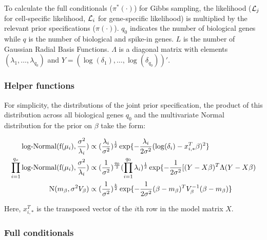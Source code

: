 To calculate the full conditionals ($\pi^*(\cdot)$) for Gibbs sampling, the likelihood ($\mathcal{L}_j$ for cell-specific likelihood, $\mathcal{L}_i$ for gene-specific likelihood) is multiplied by the relevant prior specifications ($\pi(\cdot)$). $q_0$ indicates the number of biological genes while $q$ is the number of biological and spike-in genes. $L$ is the number of Gaussian Radial Basis Functions. $\Lambda$ is a diagonal matrix with elements $(\lambda_1, \ldots, \lambda_{q_0})$ and $Y = (\log(\delta_1), \ldots, \log(\delta_{q_0}))'$.\\ 

\subsubsection{Helper functions}

For simplicity, the distributions of the joint prior specification, the product of this distribution across all biological genes $q_0$ and the multivariate Normal distribution for the prior on $\beta$ take the form:

\begin{align*}
\text{log-Normal}(\text{f}(\mu_i),\frac{\sigma^2}{\lambda_i})&\propto{}(\frac{\lambda_i}{\sigma^2})^{\frac{1}{2}}\exp\lbrace-\frac{\lambda_i}{2\sigma^2}(\log(\delta_i)-x_{i,\ast}^T\beta)^2\rbrace\\
\prod_{i=1}^{q_o}\text{log-Normal}(\text{f}(\mu_i),\frac{\sigma^2}{\lambda_i})&\propto{}(\frac{1}{\sigma^2})^{\frac{q_0}{2}}(\prod_{i=1}^{q_0}\lambda_i)^{\frac{1}{2}}\exp\lbrace-\frac{1}{2\sigma^2}[(Y-X\beta)^T\Lambda(Y-X\beta)\\
\textnormal{N}(m_\beta,\sigma^2V_\beta)&\propto{}(\frac{1}{\sigma^2})^{\frac{k}{2}}\exp\lbrace-\frac{1}{2\sigma^2}(\beta-m_\beta)^TV_\beta^{-1}(\beta-m_\beta)\rbrace\\
\end{align*}

Here, $x_{i,\ast}^T$ is the transposed vector of the $i$th row in the model matrix $X$.

\subsubsection{Full conditionals}


